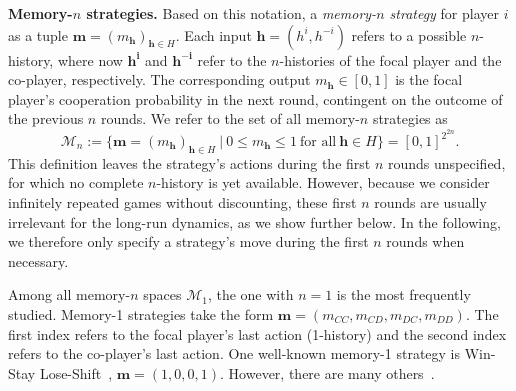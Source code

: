 \documentclass[9pt,twoside,lineno]{pnas-new}
\theoremstyle{plainCl1}
\theoremstyle{plainCl2}
\begin{document}
\noindent
{\bfseries Memory-$n$ strategies.} Based on this notation, a {\it memory-$n$ strategy}  for player $i$ as a tuple \(\mathbf{m} \!=\! (m_\mathbf{h})_{\mathbf{h}\in H}\). 
Each input $\mathbf{h}\!=\!(h^i,h^{-i})$ refers to a possible $n$-history, where now $\mathbf{h^i}$ and $\mathbf{h^{-i}}$ refer to the $n$-histories of the focal player and the co-player, respectively. 
The corresponding output $m_\mathbf{h}\!\in\![0,1]$ is the focal player's cooperation probability in the next round, contingent on  the outcome of the previous \(n\) rounds. We refer to the set of all memory-$n$ strategies as 
\begin{equation}
\mathcal{M}_n:=\Big\{ \mathbf{m}\!=\!(m_\mathbf{h})_{\mathbf{h}\in H} ~\Big|~0\!\le\!m_\mathbf{h}\!\le\!1~\text{for all}~ \mathbf{h}\!\in\! H\Big\} = [0,1]^{2^{2n}} .
\end{equation}
This definition leaves the strategy's actions during the first $n$ rounds unspecified, for which no complete $n$-history is yet available. 
However, because we consider infinitely repeated games without discounting, these first $n$ rounds are usually irrelevant for the long-run dynamics, as we show further below. 
In the following, we therefore only specify a strategy's move during the first $n$ rounds when necessary. 


Among all memory-$n$ spaces $\mathcal{M}_1$, the one with $n\!=\!1$ is the most frequently studied. 
Memory-1 strategies take the form $\mathbf{m}\!=\!(m_{CC}, m_{CD}, m_{DC}, m_{DD})$. 
The first index refers to the focal player's last action (1-history) and the second index refers to the co-player's last action. 
One well-known memory-1 strategy is Win-Stay Lose-Shift~\citep{nowak:Nature:1993}, $\mathbf{m}\!=\!(1,0,0,1)$. However, there are many others~\citep{hilbe:Nature:2018}.\\

\end{document}
